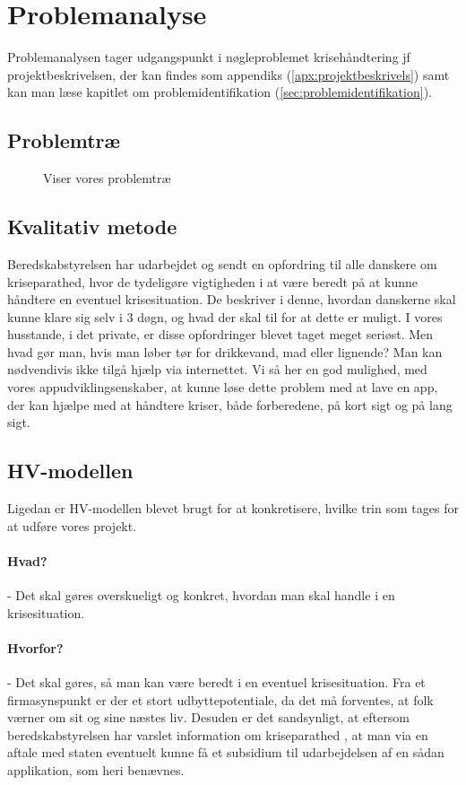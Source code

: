 \section{Problemanalyse}
Problemanalysen tager udgangspunkt i nøgleproblemet krisehåndtering jf projektbeskrivelsen, der kan findes som appendiks (\ref{apx:projektbeskrivels}) samt kan man læse kapitlet om problemidentifikation (\ref{sec:problemidentifikation}).

\subsection{Problemtræ}
\begin{figure}[H]
    \centering
    \caption{Viser vores problemtræ}
\end{figure}

\subsection{Kvalitativ metode}
Beredskabstyrelsen har udarbejdet og sendt en opfordring til alle danskere om kriseparathed, hvor de tydeligøre vigtigheden i at være beredt på at kunne håndtere en eventuel krisesituation.
De beskriver i denne, hvordan danskerne skal kunne klare sig selv i 3 døgn, og hvad der skal til for at dette er muligt.
I vores husstande, i det private, er disse opfordringer blevet taget meget seriøst. Men hvad gør man, hvis man løber tør for drikkevand, mad eller lignende? Man kan nødvendivis ikke tilgå hjælp via internettet.
Vi så her en god mulighed, med vores appudviklingsenskaber, at kunne løse dette problem med at lave en app, der kan hjælpe med at håndtere kriser, både forberedene, på kort sigt og på lang sigt.

\subsection{HV-modellen}
Ligedan er HV-modellen blevet brugt for at konkretisere, hvilke trin som tages for at udføre vores projekt.
\paragraph{Hvad?} - Det skal gøres overskueligt og konkret, hvordan man skal handle i en krisesituation.
\paragraph{Hvorfor?} - Det skal gøres, så man kan være beredt i en eventuel krisesituation. Fra et firmasynspunkt er der et stort udbyttepotentiale, da det må forventes, at folk værner om sit og sine næstes liv. Desuden er det sandsynligt, at eftersom beredskabstyrelsen har varslet information om kriseparathed \cite{krisemanual}, at man via en aftale med staten eventuelt kunne få et subsidium til udarbejdelsen af en sådan applikation, som heri benævnes.
